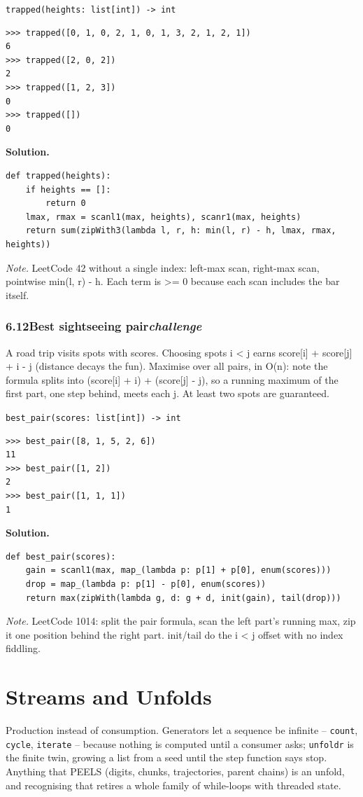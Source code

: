 \documentclass[10pt,letterpaper]{book}
\begin{document}
\noindent\texttt{trapped(heights: list[int]) -> int}
\begin{lstlisting}[style=ex]
>>> trapped([0, 1, 0, 2, 1, 0, 1, 3, 2, 1, 2, 1])
6
>>> trapped([2, 0, 2])
2
>>> trapped([1, 2, 3])
0
>>> trapped([])
0
\end{lstlisting}
\noindent\textbf{Solution.}
\begin{lstlisting}[style=code]
def trapped(heights):
    if heights == []:
        return 0
    lmax, rmax = scanl1(max, heights), scanr1(max, heights)
    return sum(zipWith3(lambda l, r, h: min(l, r) - h, lmax, rmax, heights))
\end{lstlisting}
\noindent\textit{Note.} LeetCode 42 without a single index: left-max scan, right-max scan, pointwise min(l, r) - h. Each term is >= 0 because each scan includes the bar itself.

\subsection*{6.12\quad Best sightseeing pair\hfill\textnormal{\textit{challenge}}}
A road trip visits spots with scores. Choosing spots i < j earns score[i] + score[j] + i - j (distance decays the fun). Maximise over all pairs, in O(n): note the formula splits into (score[i] + i) + (score[j] - j), so a running maximum of the first part, one step behind, meets each j. At least two spots are guaranteed.

\noindent\texttt{best\_pair(scores: list[int]) -> int}
\begin{lstlisting}[style=ex]
>>> best_pair([8, 1, 5, 2, 6])
11
>>> best_pair([1, 2])
2
>>> best_pair([1, 1, 1])
1
\end{lstlisting}
\noindent\textbf{Solution.}
\begin{lstlisting}[style=code]
def best_pair(scores):
    gain = scanl1(max, map_(lambda p: p[1] + p[0], enum(scores)))
    drop = map_(lambda p: p[1] - p[0], enum(scores))
    return max(zipWith(lambda g, d: g + d, init(gain), tail(drop)))
\end{lstlisting}
\noindent\textit{Note.} LeetCode 1014: split the pair formula, scan the left part's running max, zip it one position behind the right part. init/tail do the i < j offset with no index fiddling.

\clearpage
\chapter{Streams and Unfolds}

Production instead of consumption. Generators let a sequence be infinite --
\texttt{count}, \texttt{cycle}, \texttt{iterate} -- because nothing is
computed until a consumer asks; \texttt{unfoldr} is the finite twin, growing
a list from a seed until the step function says stop. Anything that PEELS
(digits, chunks, trajectories, parent chains) is an unfold, and recognising
that retires a whole family of while-loops with threaded state.
\end{document}
